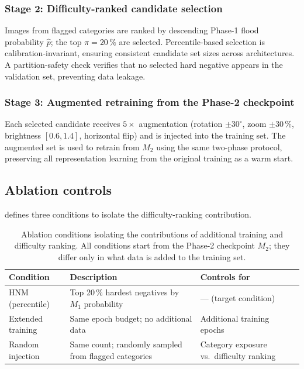 \documentclass[a4paper,fleqn]{cas-sc}
\begin{document}
\subsubsection{Stage 2: Difficulty-ranked candidate selection}

Images from flagged categories are ranked by descending Phase-1 flood probability $\hat{p}$;
the top $\pi{=}20\,\%$ are selected.
Percentile-based selection is calibration-invariant, ensuring consistent candidate set sizes
across architectures.
A partition-safety check verifies that no selected hard negative appears in the validation set, preventing data leakage.

\subsubsection{Stage 3: Augmented retraining from the Phase-2 checkpoint}

Each selected candidate receives $5\times$ augmentation (rotation $\pm30^\circ$, zoom $\pm30\,\%$,
brightness $[0.6,1.4]$, horizontal flip) and is injected into the training set.
The augmented set is used to retrain from $M_2$ using the same two-phase protocol,
preserving all representation learning from the original training as a warm start.

\subsection{Ablation controls}
\label{sec:methods:ablation}

 defines three conditions to isolate the difficulty-ranking contribution.

\begin{table}
  \centering
  \caption{Ablation conditions isolating the contributions of
           additional training and difficulty ranking.
           All conditions start from the Phase-2 checkpoint $M_2$;
           they differ only in what data is added to the training set.}
  \label{tab:ablation_design}
  \small
  \begin{tabular}{lll}
    \toprule
    \textbf{Condition} & \textbf{Description} & \textbf{Controls for} \\
    \midrule
    HNM (percentile) &
      Top 20\,\% hardest negatives by $M_1$ probability &
      --- (target condition) \\
    Extended training &
      Same epoch budget; no additional data &
      Additional training epochs \\
    Random injection &
      Same count; randomly sampled from flagged categories &
      Category exposure vs.\ difficulty ranking \\
    \bottomrule
  \end{tabular}
\end{table}
\end{document}
